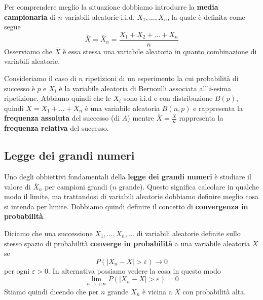 Per comprendere meglio la situazione dobbiamo introdurre la \textbf{media campionaria} di $n$
variabili aleatorie i.i.d. $X_1, \dots, X_n$, la quale è definita come segue
\[ \bar{X} = \bar{X}_n = \frac{X_1 + X_2 + \dots + X_n}{n} \]
Osserviamo che $\bar{X}$ è essa stessa una variabile aleatoria in quanto combinazione di
variabili aleatorie.

\begin{example}
	Consideriamo il caso di $n$ ripetizioni di un esperimento la cui probabilità di successo è $p$
	e $X_i$ è la variabile aleatoria di Bernoulli associata all'$i$-esima ripetizione. Abbiamo
	quindi che le $X_i$ sono i.i.d e con distribuzione $B(p)$, quindi $X = X_1 + \dots + X_n$ è una
	variabile aleatoria $B(n,p)$ e rappresenta la \textbf{frequenza assoluta} del successo (di $A$)
	mentre $\bar{X} = \frac{X}{n}$ rappresenta la \textbf{frequenza relativa} del successo.
\end{example}

\subsection{Legge dei grandi numeri}
Uno degli obbiettivi fondamentali della \textbf{legge dei grandi numeri} è studiare il valore di
$\bar{X}_n$ per campioni grandi ($n$ grande). Questo significa calcolare in qualche modo il
limite, ma trattandosi di variabili aleatorie dobbiamo definire meglio cosa si intenda per limite.
Dobbiamo quindi definire il concetto di \textbf{convergenza in probabilità}.

\begin{definition}
	Diciamo che una successione $X_1, \dots, X_n, \dots$ di variabili aleatorie definite sullo
	stesso spazio di probabilità \textbf{converge in probabilità} a una variabile aleatoria $X$ se
	\[ P(|X_n - X| > \varepsilon) \to 0 \]
	per ogni $\varepsilon > 0$. In alternativa possiamo vedere la cosa in questo modo
	\[ \lim_{n \to +\infty} P(|X_n - X| > \varepsilon) = 0 \]
	Stiamo quindi dicendo che per $n$ grande $X_n$ è vicina a $X$ con probabilità alta.
\end{definition}

